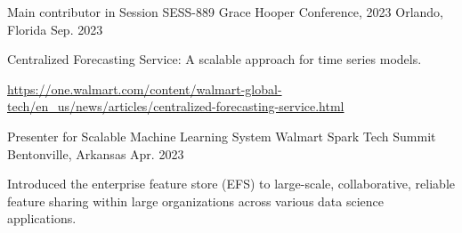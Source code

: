 

\begin{cventries}

  \cventry
    {Main contributor in Session SESS-889} %
    {Grace Hooper Conference, 2023} %
    {Orlando, Florida} %
    {Sep. 2023} %
    {
      \begin{cvitems} %
			\item {Centralized Forecasting Service: A scalable approach for time series models.}
			\item {\url{https://one.walmart.com/content/walmart-global-tech/en_us/news/articles/centralized-forecasting-service.html}}
      \end{cvitems}
    }

  \cventry
    {Presenter for Scalable Machine Learning System} %
    {Walmart Spark Tech Summit} %
    {Bentonville, Arkansas} %
    {Apr. 2023} %
    {
      \begin{cvitems} %
			\item {Introduced the enterprise feature store (EFS) to large-scale, collaborative, reliable feature sharing within large organizations across various data science applications.}
      \end{cvitems}
    }

\end{cventries}
